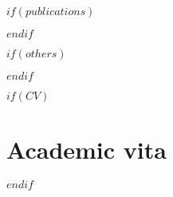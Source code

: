 \documentclass[11pt, a4paper, twoside]{MPIthesis} %
\begin{document}
\pagestyle{fancy} %


%


%



\appendix %

$if(publications)$
  
$endif$

$if(others)$
  
$endif$

$if(CV)$
 \chapter{Academic vita}
 \begin{singlespacing}
 
 \end{singlespacing}
$endif$


\backmatter




\end{document}

